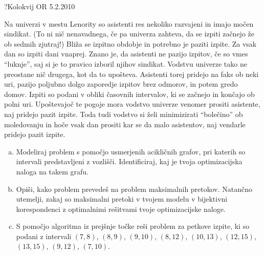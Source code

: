 \begin{naloga}{?}{Kolokvij OR 5.2.2010}
\begin{vprasanje}[lenority]
Na univerzi v mestu Lenority so asistenti res nekoliko razvajeni
in imajo močen sindikat.
(To ni nič nenavadnega, če pa univerza zahteva,
da se izpiti začnejo že ob sedmih zjutraj!)
Bliža se izpitno obdobje in potrebno je paziti izpite.
Za vsak dan so izpiti dani vnaprej.
Znano je, da asistenti ne pazijo izpitov, če so vmes ``luknje'',
saj si je to pravico izboril njihov sindikat.
Vodstvu univerze tako ne preostane nič drugega, kot da to upošteva.
Asistenti torej pridejo na faks ob neki uri,
pazijo poljubno dolgo zaporedje izpitov brez odmorov, in potem gredo domov.
Izpiti so podani v obliki časovnih intervalov,
ki se začnejo in končajo ob polni uri.
Upoštevajoč te pogoje mora vodstvo univerze venomer prositi asistente,
naj pridejo pazit izpite.
Toda tudi vodstvo si želi minimizirati ``bolečino'' ob moledovanju
in hoče vsak dan prositi kar se da malo asistentov,
naj vendarle pridejo pazit izpite.

\begin{enumerate}[(a)]
\item Modeliraj problem s pomočjo usmerjenih acikličnih grafov,
pri katerih so intervali predstavljeni z vozlišči.
Identificiraj, kaj je tvoja optimizacijska naloga na takem grafu.

\item Opiši, kako problem prevedeš na problem maksimalnih pretokov.
Natančno utemelji,
zakaj so maksimalni pretoki v tvojem modelu v bijektivni korespondenci
z optimalnimi rešitvami tvoje optimizacijske naloge.

\item S pomočjo algoritma iz prejšnje točke reši problem za petkove izpite,
ki so podani z intervali $(7, 8)$, $(8, 9)$, $(9, 10)$, $(8, 12)$,
$(10, 13)$, $(12, 15)$, $(13, 15)$, $(9, 12)$, $(7, 10)$.
\end{enumerate}
\end{vprasanje}
\begin{odgovor}
\end{odgovor}
\end{naloga}


